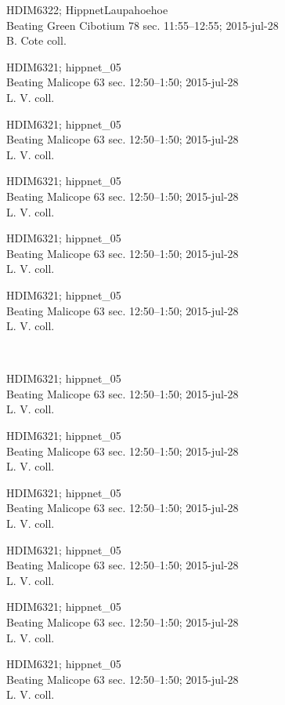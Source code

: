\documentclass[2pt]{extarticle}
\begin{document}
\noindent
\parbox{0.16\textwidth}{\tiny \raggedright \rule[-0.3\baselineskip]{0pt}{10pt}HDIM6322; HippnetLaupahoehoe\\ Beating Green Cibotium 78 sec. 11:55--12:55; 2015-jul-28\\ B. Cote coll.}
\parbox{0.16\textwidth}{\tiny \raggedright \rule[-0.3\baselineskip]{0pt}{10pt}HDIM6321; hippnet\_05\\ Beating Malicope 63 sec. 12:50--1:50; 2015-jul-28\\ L. V. coll.}
\parbox{0.16\textwidth}{\tiny \raggedright \rule[-0.3\baselineskip]{0pt}{10pt}HDIM6321; hippnet\_05\\ Beating Malicope 63 sec. 12:50--1:50; 2015-jul-28\\ L. V. coll.}
\parbox{0.16\textwidth}{\tiny \raggedright \rule[-0.3\baselineskip]{0pt}{10pt}HDIM6321; hippnet\_05\\ Beating Malicope 63 sec. 12:50--1:50; 2015-jul-28\\ L. V. coll.}
\parbox{0.16\textwidth}{\tiny \raggedright \rule[-0.3\baselineskip]{0pt}{10pt}HDIM6321; hippnet\_05\\ Beating Malicope 63 sec. 12:50--1:50; 2015-jul-28\\ L. V. coll.}
\parbox{0.16\textwidth}{\tiny \raggedright \rule[-0.3\baselineskip]{0pt}{10pt}HDIM6321; hippnet\_05\\ Beating Malicope 63 sec. 12:50--1:50; 2015-jul-28\\ L. V. coll.} \\ 
\vspace{0.001in} 

\noindent
\parbox{0.16\textwidth}{\tiny \raggedright \rule[-0.3\baselineskip]{0pt}{10pt}HDIM6321; hippnet\_05\\ Beating Malicope 63 sec. 12:50--1:50; 2015-jul-28\\ L. V. coll.}
\parbox{0.16\textwidth}{\tiny \raggedright \rule[-0.3\baselineskip]{0pt}{10pt}HDIM6321; hippnet\_05\\ Beating Malicope 63 sec. 12:50--1:50; 2015-jul-28\\ L. V. coll.}
\parbox{0.16\textwidth}{\tiny \raggedright \rule[-0.3\baselineskip]{0pt}{10pt}HDIM6321; hippnet\_05\\ Beating Malicope 63 sec. 12:50--1:50; 2015-jul-28\\ L. V. coll.}
\parbox{0.16\textwidth}{\tiny \raggedright \rule[-0.3\baselineskip]{0pt}{10pt}HDIM6321; hippnet\_05\\ Beating Malicope 63 sec. 12:50--1:50; 2015-jul-28\\ L. V. coll.}
\parbox{0.16\textwidth}{\tiny \raggedright \rule[-0.3\baselineskip]{0pt}{10pt}HDIM6321; hippnet\_05\\ Beating Malicope 63 sec. 12:50--1:50; 2015-jul-28\\ L. V. coll.}
\parbox{0.16\textwidth}{\tiny \raggedright \rule[-0.3\baselineskip]{0pt}{10pt}HDIM6321; hippnet\_05\\ Beating Malicope 63 sec. 12:50--1:50; 2015-jul-28\\ L. V. coll.} \\ 
\vspace{0.001in} 
\end{document}
